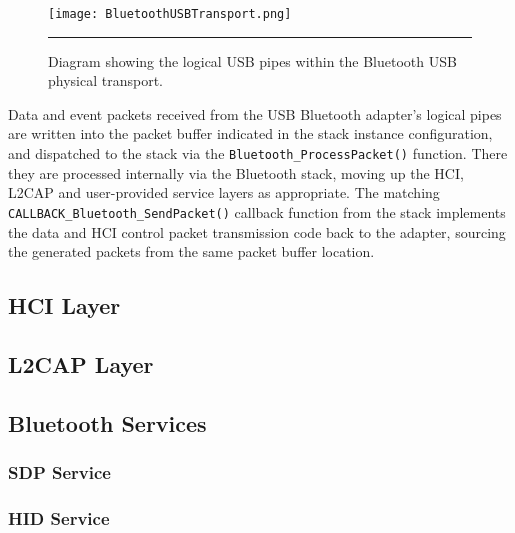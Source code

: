 \begin{figure}[tbph]
	\vspace{1em}
	\centering
		\texttt{[image: BluetoothUSBTransport.png]}
	\rule{35em}{0.5pt}
	\caption[Diagram of the logical pipes within the Bluetooth USB transport.]{Diagram showing the logical USB pipes within the Bluetooth USB physical transport.}
	\label{fig:btusbtransport}
\end{figure}

Data and event packets received from the USB Bluetooth adapter's logical pipes are written into the packet buffer indicated in the stack instance configuration, and dispatched to the stack via the \lstinline{Bluetooth_ProcessPacket()} function. There they are processed internally via the Bluetooth stack, moving up the HCI, L2CAP and user-provided service layers as appropriate. The matching \lstinline{CALLBACK_Bluetooth_SendPacket()} callback function from the stack implements the data and HCI control packet transmission code back to the adapter, sourcing the generated packets from the same packet buffer location.

\FloatBarrier
\subsection{HCI Layer}


\FloatBarrier
\subsection{L2CAP Layer}


\FloatBarrier
\subsection{Bluetooth Services}


\FloatBarrier
\subsubsection{SDP Service}


\FloatBarrier
\subsubsection{HID Service}


